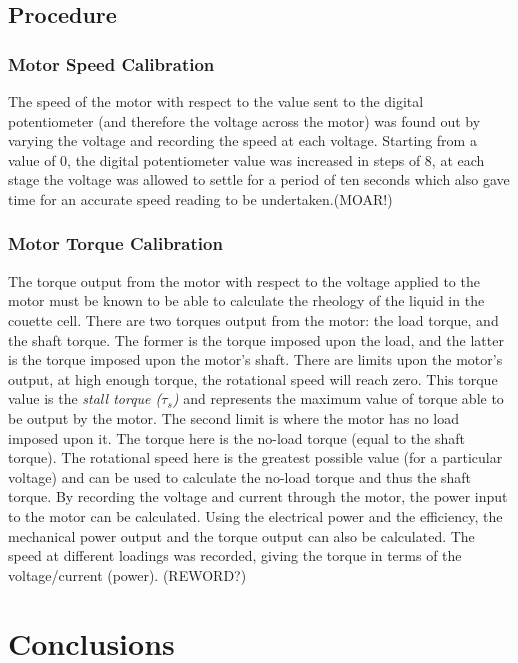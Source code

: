 \documentclass[a4]{report}
\def\achapter{preamble}
\begin{document}
	\section{Procedure}
	\subsection{Motor Speed Calibration}
	The speed of the motor with respect to the value sent to the digital potentiometer (and therefore the voltage across the motor) was found out by varying the voltage and recording the speed at each voltage. Starting from a value of 0, the digital potentiometer value was increased in steps of 8, at each stage the voltage was allowed to settle for a period of ten seconds which also gave time for an accurate speed reading to be undertaken.(MOAR!)
	\subsection{Motor Torque Calibration}
	The torque output from the motor with respect to the voltage applied to the motor must be known to be able to calculate the rheology of the liquid in the couette cell. There are two torques output from the motor: the load torque, and the shaft torque. The former is the torque imposed upon the load, and the latter is the torque imposed upon the motor's shaft. \newline \newline \noindent 
	There are limits upon the motor's output, at high enough torque, the rotational speed will reach zero. This torque value is the \textit{stall torque (\(\tau_s\))} and represents the maximum value of torque able to be output by the motor. The second limit is where the motor has no load imposed upon it. The torque here is the no-load torque (equal to the shaft torque). The rotational speed here is the greatest possible value (for a particular voltage) and can be used to calculate the no-load torque and thus the shaft torque. \newline \newline \noindent
	By recording the voltage and current through the motor, the power input to the motor can be calculated. Using the electrical power and the efficiency, the mechanical power output and the torque output can also be calculated. The speed at different loadings was recorded, giving the torque in terms of the voltage/current (power). (REWORD?)




	\chapter*{Conclusions}
	\def\achapter{Conclusions}
	
\end{document}
